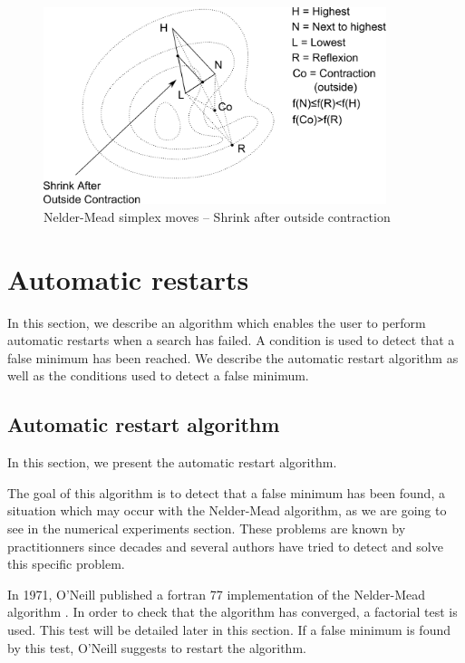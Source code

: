 \begin{figure}
\begin{center}
\includegraphics[width=10cm]{neldermeadmethod/nelder-mead-shrink-afterco.pdf}
\end{center}
\caption{Nelder-Mead simplex moves -- Shrink after outside contraction}
\label{fig-nm-moves-shrinkafterco}
\end{figure}




\section{Automatic restarts}

In this section, we describe an algorithm which enables the user 
to perform automatic restarts when a search has failed. 
A condition is used to detect that a false minimum has been reached.
We describe the automatic restart algorithm as well as the 
conditions used to detect a false minimum.

\subsection{Automatic restart algorithm}

In this section, we present the automatic restart algorithm.

The goal of this algorithm is to detect that a false minimum has been found,
a situation which may occur with the Nelder-Mead algorithm, as we are 
going to see in the numerical experiments section. 
These problems are known by practitionners since decades and several authors 
have tried to detect and solve this specific problem.

In 1971, O'Neill published a fortran 77 implementation of the Nelder-Mead
algorithm \cite{O'Neill1971AAF}. In order to check that the algorithm has converged, 
a factorial test is used. This test will be detailed later in this section.
If a false minimum is found by this test, O'Neill suggests to restart the 
algorithm.

